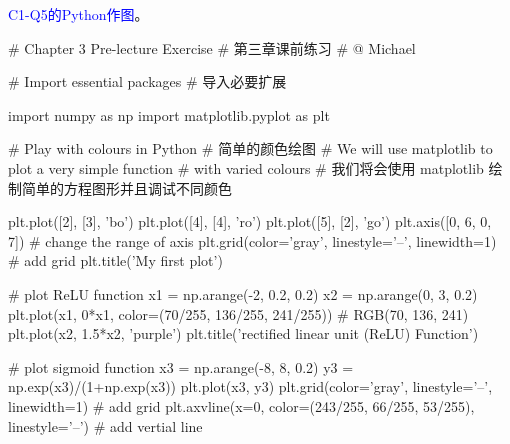 \documentclass[12pt]{article}
\numberwithin{figure}{section}
\numberwithin{equation}{section}
\begin{document}
\noindent
\textcolor{blue}{C1-Q5的Python作图}。
\begin{python}
# Chapter 3 Pre-lecture Exercise
# 第三章课前练习
# @ Michael

# Import essential packages
# 导入必要扩展

import numpy as np
import matplotlib.pyplot as plt

# Play with colours in Python
# 简单的颜色绘图
# We will use matplotlib to plot a very simple function 
# with varied colours
# 我们将会使用 matplotlib 绘制简单的方程图形并且调试不同颜色

plt.plot([2], [3], 'bo')
plt.plot([4], [4], 'ro')
plt.plot([5], [2], 'go')
plt.axis([0, 6, 0, 7])  # change the range of axis
plt.grid(color='gray', linestyle='--', linewidth=1)  # add grid
plt.title('My first plot')


# plot ReLU function
x1 = np.arange(-2, 0.2, 0.2)
x2 = np.arange(0, 3, 0.2)
plt.plot(x1, 0*x1, color=(70/255, 136/255, 241/255))
# RGB(70, 136, 241)
plt.plot(x2, 1.5*x2, 'purple')
plt.title('rectified linear unit (ReLU) Function')


# plot sigmoid function
x3 = np.arange(-8, 8, 0.2)
y3 = np.exp(x3)/(1+np.exp(x3))
plt.plot(x3, y3)
plt.grid(color='gray', linestyle='--', linewidth=1)  # add grid
plt.axvline(x=0, color=(243/255, 66/255, 53/255), linestyle='--')
# add vertial line
\end{python}
\end{document}
